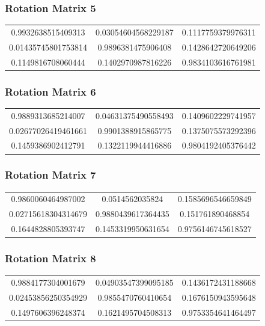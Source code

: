 \documentclass[12pt]{article}
\begin{document}
\subsubsection{Rotation Matrix 5}
\begin{tabular}{|c|c|c|}
\hline

  
 0.9932638515409313 &  0.03054604568229187 &  0.1117759379976311 \\ 
  0.01435745801753814 &  0.9896381475906408 &  0.1428642720649206 \\ 
  0.1149816708060444 &  0.1402970987816226 &  0.9834103616761981
\\ 
\hline
\end{tabular}
\subsubsection{Rotation Matrix 6}
\begin{tabular}{|c|c|c|}
\hline

  
 0.9889313685214007 &  0.04631375490558493 &  0.1409602229741957 \\ 
  0.02677026419461661 &  0.9901388915865775 &  0.1375075573292396 \\ 
  0.1459386902412791 &  0.1322119944416886 &  0.9804192405376442
\\ 
\hline
\end{tabular}
\subsubsection{Rotation Matrix 7}
\begin{tabular}{|c|c|c|}
\hline

  
 0.9860060464987002 &  0.0514562035824 &  0.1585696546659849 \\ 
  0.02715618304314679 &  0.9880439617364435 &  0.151761890468854 \\ 
  0.1644828805393747 &  0.1453319950631654 &  0.9756146745618527
\\ 
\hline
\end{tabular}
\subsubsection{Rotation Matrix 8}
\begin{tabular}{|c|c|c|}
\hline

  
 0.9884177304001679 &  0.04903547399095185 &  0.1436172431188668 \\ 
  0.02453856250354929 &  0.9855470760410654 &  0.1676150943595648 \\ 
  0.1497606396248374 &  0.1621495704508313 &  0.9753354641464497
\\ 
\hline
\end{tabular}
\end{document}
